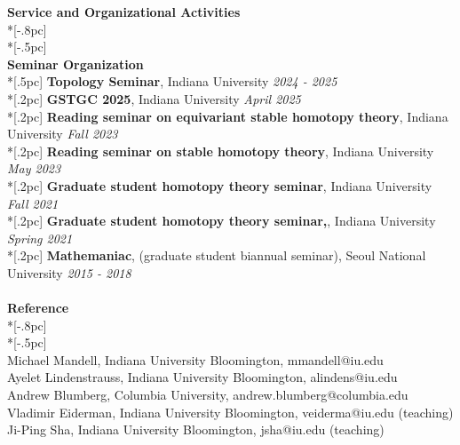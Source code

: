 \documentclass{article}
\begin{document}
{\Large \bf Service and Organizational Activities} \\*[-.8pc]
\underline{\hspace{6.5in}} \\*[-.5pc]
\\
{\bf \large Seminar Organization} \\*[.5pc]
{\bf Topology Seminar}, Indiana University \hfill {\it 2024 - 2025\/} \\*[.2pc]
{\bf GSTGC 2025}, Indiana University \hfill {\it April 2025\/} \\*[.2pc]
{\bf Reading seminar on equivariant stable homotopy theory}, Indiana University \hfill {\it Fall 2023 \/} \\*[.2pc]
{\bf Reading seminar on stable homotopy theory}, Indiana University \hfill {\it May 2023 \/} \\*[.2pc]
{\bf Graduate student homotopy theory seminar}, Indiana University \hfill {\it Fall 2021\/} \\*[.2pc]
{\bf Graduate student homotopy theory seminar,}, Indiana University \hfill {\it Spring 2021\/} \\*[.2pc]
{\bf Mathemaniac}, (graduate student biannual seminar), Seoul National University  \hfill {\it 2015 - 2018\/} \\
\\
{\Large \bf Reference} \\*[-.8pc]
\underline{\hspace{6.5in}} \\*[-.5pc]
\\
{Michael Mandell, Indiana University Bloomington, mmandell@iu.edu}  \\
{Ayelet Lindenstrauss, Indiana University Bloomington, alindens@iu.edu} \\
{Andrew Blumberg, Columbia University, andrew.blumberg@columbia.edu}  \\
{Vladimir Eiderman, Indiana University Bloomington, veiderma@iu.edu} \hfill {(teaching)} \\
{Ji-Ping Sha, Indiana University Bloomington, jsha@iu.edu} \hfill {(teaching)} \\
\end{document}
